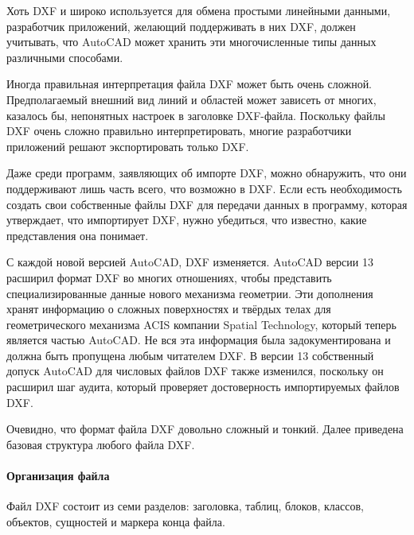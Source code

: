 Хоть DXF и широко используется для обмена простыми линейными данными, разработчик приложений, желающий поддерживать в них DXF, должен учитывать, что AutoCAD может хранить эти многочисленные типы данных различными способами.

Иногда правильная интерпретация файла DXF может быть очень сложной. Предполагаемый внешний вид линий и областей может зависеть от многих, казалось бы, непонятных настроек в заголовке DXF-файла. Поскольку файлы DXF очень сложно правильно интерпретировать, многие разработчики приложений решают экспортировать только DXF.

Даже среди программ, заявляющих об импорте DXF, можно обнаружить, что они поддерживают лишь часть всего, что возможно в DXF. Если есть необходимость создать свои собственные файлы DXF для передачи данных в программу, которая утверждает, что импортирует DXF, нужно убедиться, что известно, какие представления она понимает.

С каждой новой версией AutoCAD, DXF изменяется. AutoCAD версии 13 расширил формат DXF во многих отношениях, чтобы представить специализированные данные нового механизма геометрии. Эти дополнения хранят информацию о сложных поверхностях и твёрдых телах для геометрического механизма ACIS компании Spatial Technology, который теперь является частью AutoCAD. Не вся эта информация была задокументирована и должна быть пропущена любым читателем DXF. В версии 13 собственный допуск AutoCAD для числовых файлов DXF также изменился, поскольку он расширил шаг аудита, который проверяет достоверность импортируемых файлов DXF.

Очевидно, что формат файла DXF довольно сложный и тонкий. Далее приведена базовая структура любого файла DXF.

\paragraph{Организация файла}

Файл DXF состоит из семи разделов: заголовка, таблиц, блоков, классов, объектов, сущностей и маркера конца файла.

